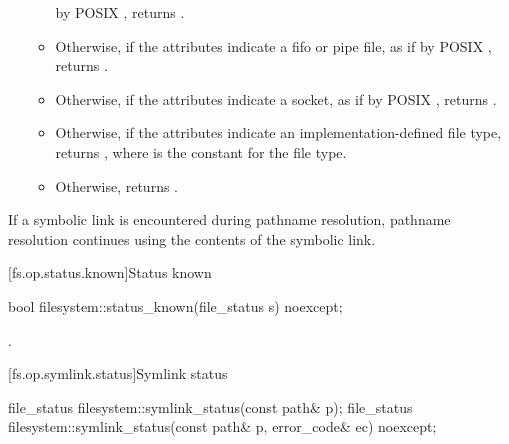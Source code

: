 \begin{itemdescr}
\begin{itemize}
\begin{itemize}
      by POSIX , returns .
\item Otherwise, if the attributes indicate a fifo or pipe file, as if by
      POSIX , returns .
\item Otherwise, if the attributes indicate a socket, as if by POSIX
      , returns .
\item Otherwise, if the attributes indicate an implementation-defined
      file type,
      returns ,
      where  is the constant for the
       file type.
\item Otherwise, returns .
\end{itemize}
\end{itemize}

\pnum
\remarks
If a symbolic link is encountered during pathname resolution,
      pathname resolution continues using the contents of the symbolic link.
\end{itemdescr}


[fs.op.status.known]{Status known}

%
\begin{itemdecl}
bool filesystem::status_known(file_status s) noexcept;
\end{itemdecl}

\begin{itemdescr}
\pnum
\returns
{}.
\end{itemdescr}


[fs.op.symlink.status]{Symlink status}

%
\begin{itemdecl}
file_status filesystem::symlink_status(const path& p);
file_status filesystem::symlink_status(const path& p, error_code& ec) noexcept;
\end{itemdecl}

